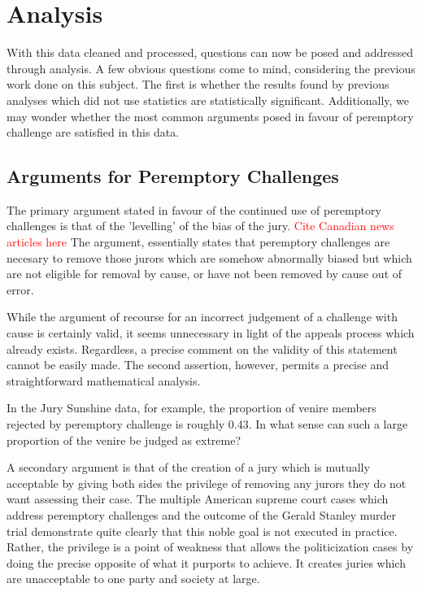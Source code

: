 \documentclass{article}
\begin{document}
\section{Analysis} \label{sec:analysis}

With this data cleaned and processed, questions can now be posed and addressed through analysis. A few obvious questions come to
mind, considering the previous work done on this subject. The first is whether the results found by previous analyses which did
not use statistics are statistically significant. Additionally, we may wonder whether the most common arguments posed in favour of
peremptory challenge are satisfied in this data.

\subsection{Arguments for Peremptory Challenges} \label{subsec:leveling}

The primary argument stated in favour of the continued use of peremptory challenges is that of the 'levelling' of the bias of the
jury. \textcolor{red}{Cite Canadian news articles here} The argument, essentially states that peremptory challenges are necesary
to remove those jurors which are somehow abnormally biased but which are not eligible for removal by cause, or have not been
removed by cause out of error.

While the argument of recourse for an incorrect judgement of a challenge with cause is certainly valid, it seems unnecessary in
light of the appeals process which already exists. Regardless, a precise comment on the validity of this statement cannot be
easily made. The second assertion, however, permits a precise and straightforward mathematical analysis.

In the Jury Sunshine data, for example, the proportion of venire members rejected by peremptory challenge is roughly 0.43. In what
sense can such a large proportion of the venire be judged as extreme?

A secondary argument is that of the creation of a jury which is mutually acceptable by giving both sides the privilege of removing
any jurors they do not want assessing their case. The multiple American supreme court cases which address peremptory challenges
and the outcome of the Gerald Stanley murder trial demonstrate quite clearly that this noble goal is not executed in
practice. Rather, the privilege is a point of weakness that allows the politicization cases by doing the precise opposite of what
it purports to achieve. It creates juries which are unacceptable to one party and society at large.
\end{document}
